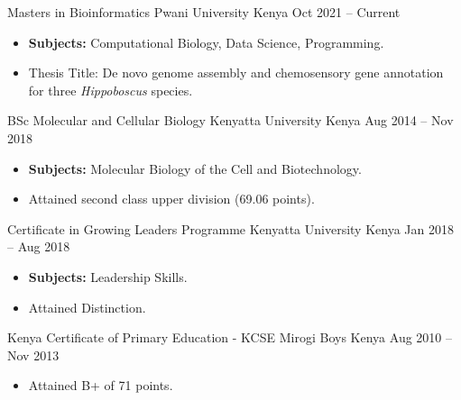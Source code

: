 


\begin{cventries}

    \cventry
    {Masters in Bioinformatics} %
    {Pwani University} %
    {Kenya} %
    {Oct 2021 -- Current} %
    {
      \begin{itemize} %
        \item \textbf{Subjects:} Computational Biology, Data Science, Programming.
        \item Thesis Title: De novo genome assembly and chemosensory gene annotation for three \textit{Hippoboscus} species.
      \end{itemize}
    }
    
    \cventry
    {BSc Molecular and Cellular Biology} %
    {Kenyatta University} %
    {Kenya} %
    {Aug 2014 -- Nov 2018} %
    {
      \begin{itemize} %
        \item \textbf{Subjects:} Molecular Biology of the Cell and Biotechnology.
        \item Attained second class upper division (69.06 points).
      \end{itemize}
    }
    
    \cventry
    {Certificate in Growing Leaders Programme} %
    {Kenyatta University} %
    {Kenya} %
    {Jan 2018 -- Aug 2018} %
    {
      \begin{itemize} %
        \item \textbf{Subjects:} Leadership Skills.
        \item Attained Distinction.
      \end{itemize}
    }
    
    \cventry
    {Kenya Certificate of Primary Education - KCSE} %
    {Mirogi Boys} %
    {Kenya} %
    {Aug 2010 -- Nov 2013} %
    {
      \begin{itemize} %
        \item Attained B+ of 71 points.
      \end{itemize}
    }
    
\end{cventries}
